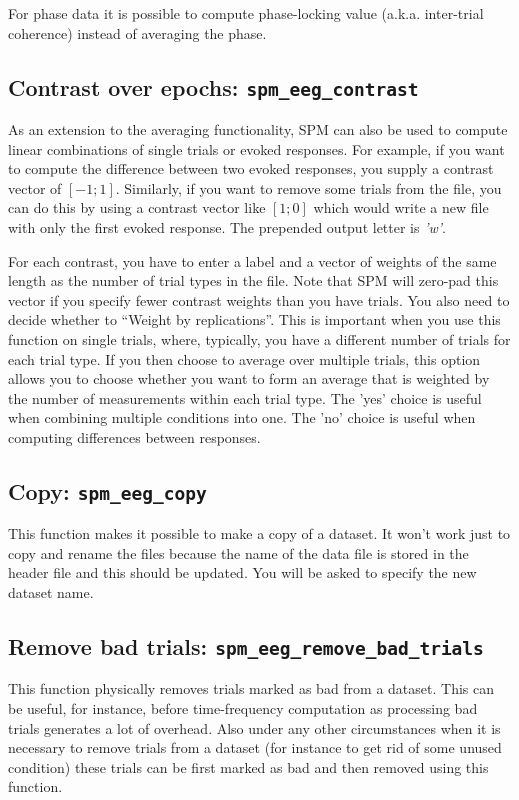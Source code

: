 For phase data it is possible to compute phase-locking value (a.k.a. inter-trial coherence) instead of averaging the phase.

\subsection{Contrast over epochs: \texttt{spm\_eeg\_contrast}}
As an extension to the averaging functionality, SPM can also be used to compute linear combinations of single trials or evoked responses. For example, if you want to compute the difference between two evoked responses, you supply a contrast vector of $[-1; 1]$. Similarly, if you want to remove some trials from the file, you can do this by using a contrast vector like $[1; 0]$ which would write a new file with only the first evoked response. The prepended output letter is \textit{'w'}.

For each contrast, you have to enter a label and a vector of weights of the same length as the number of trial types in the file. Note that SPM will zero-pad this vector if you specify fewer contrast weights than you have trials.  You also need to decide whether to ``Weight by replications''. This is important when you use this function on single trials, where, typically, you have a different number of trials for each trial type. If you then choose to average over multiple trials, this option allows you to choose whether you want to form an average that is weighted by the number of measurements within each trial type. The 'yes' choice is useful when combining multiple conditions into one. The 'no' choice is useful when computing differences between responses.

\subsection{Copy: \texttt{spm\_eeg\_copy}}
This function makes it possible to make a copy of a dataset. It won't work just to copy and rename the files because the name of the data file is stored in the header file and this should be updated. You will be asked to specify the new dataset name.

\subsection{Remove bad trials: \texttt{spm\_eeg\_remove\_bad\_trials}}
This function physically removes trials marked as bad from a dataset. This can be useful, for instance, before time-frequency computation as processing bad trials generates a lot of overhead. Also under any other circumstances when it is necessary to remove trials from a dataset (for instance to get rid of some unused condition) these trials can be first marked as bad and then removed using this function.


